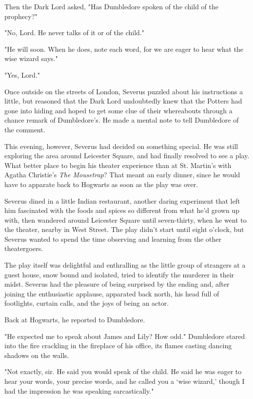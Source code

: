 Then the Dark Lord asked, "Has Dumbledore spoken of the child of the prophecy?"

"No, Lord. He never talks of it or of the child."

"He will soon. When he does, note each word, for we are eager to hear what the wise wizard says."

"Yes, Lord."

Once outside on the streets of London, Severus puzzled about his instructions a little, but reasoned that the Dark Lord undoubtedly knew that the Potters had gone into hiding and hoped to get some clue of their whereabouts through a chance remark of Dumbledore's. He made a mental note to tell Dumbledore of the comment.

This evening, however, Severus had decided on something special. He was still exploring the area around Leicester Square, and had finally resolved to see a play. What better place to begin his theater experience than at St. Martin's with Agatha Christie's \emph{The Mousetrap}? That meant an early dinner, since he would have to apparate back to Hogwarts as soon as the play was over.

Severus dined in a little Indian restaurant, another daring experiment that left him fascinated with the foods and spices so different from what he'd grown up with, then wandered around Leicester Square until seven-thirty, when he went to the theater, nearby in West Street. The play didn't start until eight o'clock, but Severus wanted to spend the time observing and learning from the other theatergoers.

The play itself was delightful and enthralling as the little group of strangers at a guest house, snow bound and isolated, tried to identify the murderer in their midst. Severus had the pleasure of being surprised by the ending and, after joining the enthusiastic applause, apparated back north, his head full of footlights, curtain calls, and the joys of being an actor.

Back at Hogwarts, he reported to Dumbledore.

"He expected me to speak about James and Lily? How odd." Dumbledore stared into the fire crackling in the fireplace of his office, its flames casting dancing shadows on the walls.

"Not exactly, sir. He said you would speak of the child. He said he was eager to hear your words, your precise words, and he called you a `wise wizard,' though I had the impression he was speaking sarcastically."

